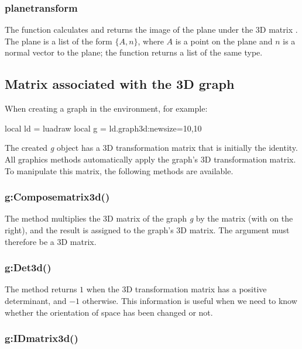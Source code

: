 \subsubsection{planetransform}

The function  calculates and returns the image of the plane  under the 3D matrix . The plane  is a list of the form $\{A,n\}$, where $A$ is a point on the plane and $n$ is a normal vector to the plane; the function returns a list of the same type.

\subsection{Matrix associated with the 3D graph}

When creating a graph in the \luadrawenv environment, for example:
\begin{Luacode}
local ld = luadraw
local g = ld.graph3d:new{size={10,10}}
\end{Luacode}

The created \emph{g} object has a 3D transformation matrix that is initially the identity. All graphics methods automatically apply the graph's 3D transformation matrix. To manipulate this matrix, the following methods are available.

\subsubsection{g:Composematrix3d()}

The  method multiplies the 3D matrix of the graph \emph g by the matrix  (with  on the right), and the result is assigned to the graph's 3D matrix. The argument  must therefore be a 3D matrix.

\subsubsection{g:Det3d()}

The  method returns $1$ when the 3D transformation matrix has a positive determinant, and $-1$ otherwise. This information is useful when we need to know whether the orientation of space has been changed or not.

\subsubsection{g:IDmatrix3d()}

